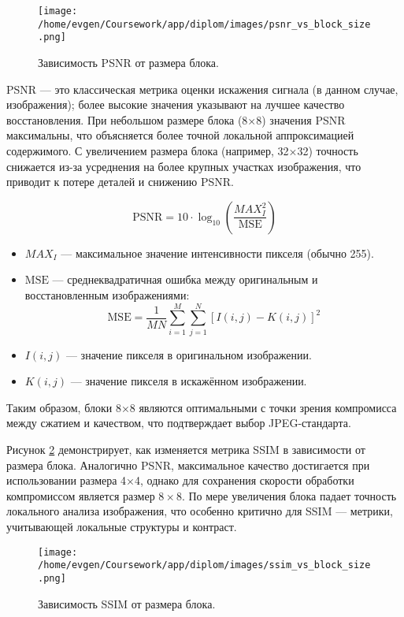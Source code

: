 \begin{figure}[H]
    \centering
    \texttt{[image: /home/evgen/Coursework/app/diplom/images/psnr\_vs\_block\_size.png]}
    \caption{Зависимость PSNR от размера блока.}
    \label{fig:psnr_vs_blocksize}
\end{figure}

PSNR — это классическая метрика оценки искажения сигнала (в данном случае, изображения); 
более высокие значения указывают на лучшее качество восстановления. При небольшом размере блока 
(8×8) значения PSNR максимальны, что объясняется более точной локальной аппроксимацией содержимого. 
С увеличением размера блока (например, 32×32) точность снижается из-за усреднения на более крупных 
участках изображения, что приводит к потере деталей и снижению PSNR.

\begin{equation}
\text{PSNR} = 10 \cdot \log_{10} \left( \frac{MAX_I^2}{\text{MSE}} \right)
\end{equation}


\begin{itemize}
    \item $MAX_I$ — максимальное значение интенсивности пикселя (обычно 255).
    \item $\text{MSE}$ — среднеквадратичная ошибка между оригинальным и восстановленным изображениями:
    \[
    \text{MSE} = \frac{1}{MN} \sum_{i=1}^{M} \sum_{j=1}^{N} \left[ I(i,j) - K(i,j) \right]^2
    \]
    \item $I(i,j)$ — значение пикселя в оригинальном изображении.
    \item $K(i,j)$ — значение пикселя в искажённом изображении.
\end{itemize}



Таким образом, блоки 8×8 являются оптимальными с точки зрения компромисса между сжатием и качеством, 
что подтверждает выбор JPEG-стандарта.

Рисунок \ref{fig:ssim_vs_blocksize} демонстрирует, как изменяется метрика SSIM в зависимости от размера блока. 
Аналогично PSNR, максимальное качество достигается при использовании размера 4×4, однако для сохранения скорости обработки
компромиссом является размер $8 \times 8$. 
По мере увеличения блока падает точность локального анализа изображения, 
что особенно критично для SSIM — метрики, учитывающей локальные структуры и контраст.

\begin{figure}[H]
    \centering
    \texttt{[image: /home/evgen/Coursework/app/diplom/images/ssim\_vs\_block\_size.png]}
    \caption{Зависимость SSIM от размера блока.}
    \label{fig:ssim_vs_blocksize}
\end{figure}

